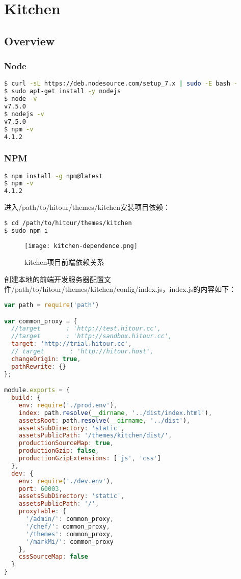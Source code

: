 \part{Kitchen}

\chapter{Overview}


\section{Node}


\begin{lstlisting}[language=bash]
$ curl -sL https://deb.nodesource.com/setup_7.x | sudo -E bash -
$ sudo apt-get install -y nodejs
$ node -v
v7.5.0
$ nodejs -v
v7.5.0
$ npm -v
4.1.2
\end{lstlisting}


\section{NPM}

\begin{lstlisting}[language=bash]
$ npm install -g npm@latest
$ npm -v
4.1.2
\end{lstlisting}

进入/path/to/hitour/themes/kitchen安装项目依赖：


\begin{lstlisting}[language=bash]
$ cd /path/to/hitour/themes/kitchen
$ sudo npm i
\end{lstlisting}

\begin{figure}[htbp]
\centering
\texttt{[image: kitchen-dependence.png]}
\caption{kitchen项目前端依赖关系}
\end{figure}


创建本地的前端开发服务器配置文件/path/to/hitour/themes/kitchen/config/index.js，index.js的内容如下：

\begin{lstlisting}[language=JavaScript]
var path = require('path')

var common_proxy = {
  //target       : 'http://test.hitour.cc',
  //target       : 'http://sandbox.hitour.cc',
  target: 'http://trial.hitour.cc',
  // target       : 'http://hitour.host',
  changeOrigin: true,
  pathRewrite: {}
};

module.exports = {
  build: {
    env: require('./prod.env'),
    index: path.resolve(__dirname, '../dist/index.html'),
    assetsRoot: path.resolve(__dirname, '../dist'),
    assetsSubDirectory: 'static',
    assetsPublicPath: '/themes/kitchen/dist/',
    productionSourceMap: true,
    productionGzip: false,
    productionGzipExtensions: ['js', 'css']
  },
  dev: {
    env: require('./dev.env'),
    port: 60003,
    assetsSubDirectory: 'static',
    assetsPublicPath: '/',
    proxyTable: {
      '/admin/': common_proxy,
      '/chef/': common_proxy,
      '/themes': common_proxy,
      '/markMi/': common_proxy
    },
    cssSourceMap: false
  }
}
\end{lstlisting}

